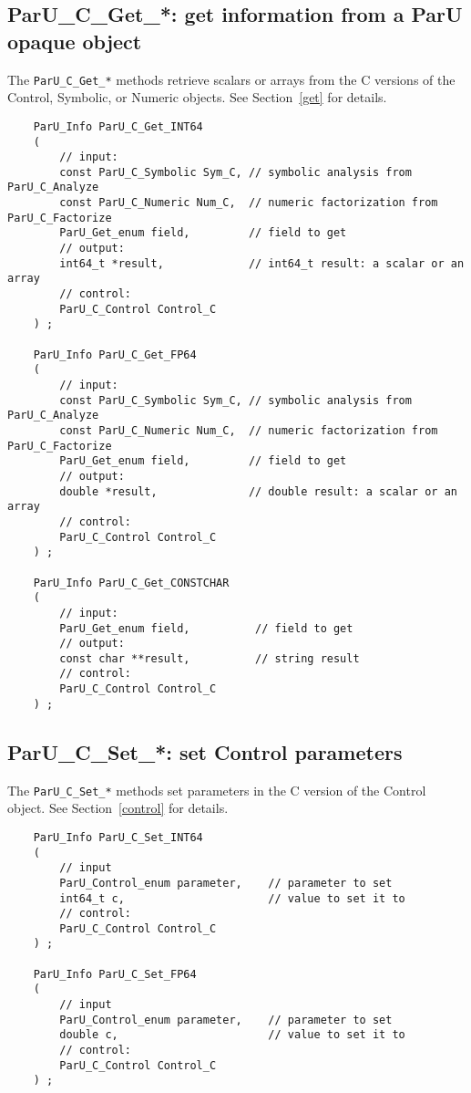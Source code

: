 \documentclass[12pt]{article}
\begin{document}
\subsection{{\sf ParU\_C\_Get\_*}: get information from a ParU opaque object}

The \verb'ParU_C_Get_*' methods retrieve scalars or arrays from the C versions
of the Control, Symbolic, or Numeric objects.  See Section~\ref{get} for
details.

    {\footnotesize
    \begin{verbatim}
    ParU_Info ParU_C_Get_INT64
    (
        // input:
        const ParU_C_Symbolic Sym_C, // symbolic analysis from ParU_C_Analyze
        const ParU_C_Numeric Num_C,  // numeric factorization from ParU_C_Factorize
        ParU_Get_enum field,         // field to get
        // output:
        int64_t *result,             // int64_t result: a scalar or an array
        // control:
        ParU_C_Control Control_C
    ) ;

    ParU_Info ParU_C_Get_FP64
    (
        // input:
        const ParU_C_Symbolic Sym_C, // symbolic analysis from ParU_C_Analyze
        const ParU_C_Numeric Num_C,  // numeric factorization from ParU_C_Factorize
        ParU_Get_enum field,         // field to get
        // output:
        double *result,              // double result: a scalar or an array
        // control:
        ParU_C_Control Control_C
    ) ;

    ParU_Info ParU_C_Get_CONSTCHAR
    (
        // input:
        ParU_Get_enum field,          // field to get
        // output:
        const char **result,          // string result
        // control:
        ParU_C_Control Control_C
    ) ; \end{verbatim} }

\subsection{{\sf ParU\_C\_Set\_*}: set Control parameters}

The \verb'ParU_C_Set_*' methods set parameters in the C version of the
Control object.  See Section~\ref{control} for details.

    {\footnotesize
    \begin{verbatim}
    ParU_Info ParU_C_Set_INT64
    (
        // input
        ParU_Control_enum parameter,    // parameter to set
        int64_t c,                      // value to set it to
        // control:
        ParU_C_Control Control_C
    ) ;

    ParU_Info ParU_C_Set_FP64
    (
        // input
        ParU_Control_enum parameter,    // parameter to set
        double c,                       // value to set it to
        // control:
        ParU_C_Control Control_C
    ) ; \end{verbatim} }
\end{document}
